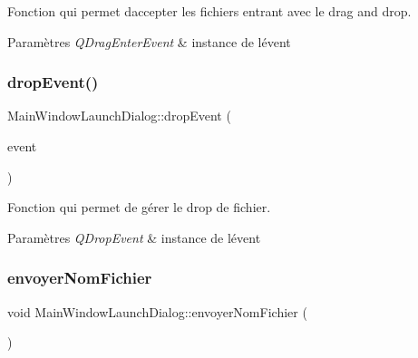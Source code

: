 Fonction qui permet d\textquotesingle{}accepter les fichiers entrant avec le drag and drop. 


\begin{DoxyParams}{Paramètres}
{\em Q\+Drag\+Enter\+Event} & instance de l\textquotesingle{}évent \\
\hline
\end{DoxyParams}
\mbox{\label{classMainWindowLaunchDialog_a6b292183d418fe79b79225d9a35bd3dd}} 
\subsubsection{\texorpdfstring{drop\+Event()}{dropEvent()}}
{\footnotesize\ttfamily Main\+Window\+Launch\+Dialog\+::drop\+Event (\begin{DoxyParamCaption}\item[{Q\+Drop\+Event $\ast$}]{event }\end{DoxyParamCaption})\hspace{0.3cm}{\ttfamily [private]}}



Fonction qui permet de gérer le drop de fichier. 


\begin{DoxyParams}{Paramètres}
{\em Q\+Drop\+Event} & instance de l\textquotesingle{}évent \\
\hline
\end{DoxyParams}
\mbox{\label{classMainWindowLaunchDialog_ab439c55ab98e6b1634de4fe64243ce48}} 
\subsubsection{\texorpdfstring{envoyer\+Nom\+Fichier}{envoyerNomFichier}}
{\footnotesize\ttfamily void Main\+Window\+Launch\+Dialog\+::envoyer\+Nom\+Fichier (\begin{DoxyParamCaption}\item[{Q\+String}]{ }\end{DoxyParamCaption})\hspace{0.3cm}{\ttfamily [signal]}}



